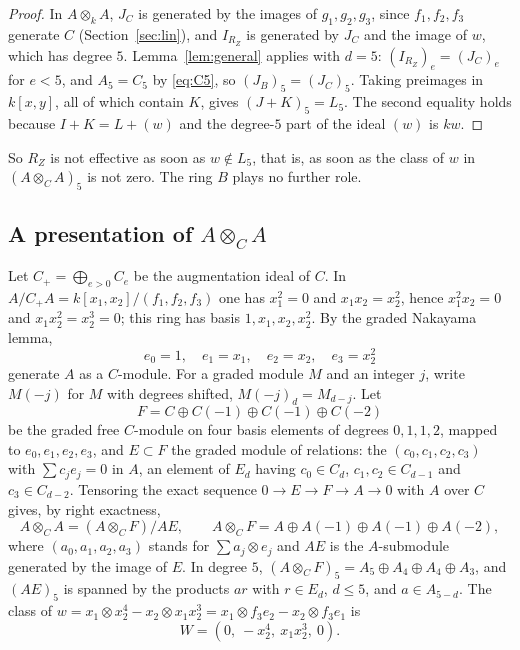\documentclass[11pt,a4paper]{amsart}
\theoremstyle{remark}
\begin{document}
\begin{proof}
In $A \otimes_k A$, $J_C$ is generated by the images of $g_1, g_2, g_3$, since $f_1, f_2, f_3$ generate $C$ (Section~\ref{sec:lin}), and $I_{R_Z}$ is generated by $J_C$ and the image of $w$, which has degree $5$. Lemma~\ref{lem:general} applies with $d = 5$: $(I_{R_Z})_e = (J_C)_e$ for $e < 5$, and $A_5 = C_5$ by \eqref{eq:C5}, so $(J_B)_5 = (J_C)_5$. Taking preimages in $k[x, y]$, all of which contain $K$, gives $(J + K)_5 = L_5$. The second equality holds because $I + K = L + (w)$ and the degree-$5$ part of the ideal $(w)$ is $kw$.
\end{proof}

So $R_Z$ is not effective as soon as $w \notin L_5$, that is, as soon as the class of $w$ in $(A \otimes_C A)_5$ is not zero. The ring $B$ plays no further role.

\subsection{A presentation of $A \otimes_C A$}
Let $C_+ = \bigoplus_{e > 0} C_e$ be the augmentation ideal of $C$. In $A/C_+A = k[x_1, x_2]/(f_1, f_2, f_3)$ one has $x_1^2 = 0$ and $x_1x_2 = x_2^2$, hence $x_1^2x_2 = 0$ and $x_1x_2^2 = x_2^3 = 0$; this ring has basis $1, x_1, x_2, x_2^2$. By the graded Nakayama lemma,
\[
e_0 = 1, \quad e_1 = x_1, \quad e_2 = x_2, \quad e_3 = x_2^2
\]
generate $A$ as a $C$-module. For a graded module $M$ and an integer $j$, write $M(-j)$ for $M$ with degrees shifted, $M(-j)_d = M_{d-j}$. Let
\[
F = C \oplus C(-1) \oplus C(-1) \oplus C(-2)
\]
be the graded free $C$-module on four basis elements of degrees $0, 1, 1, 2$, mapped to $e_0, e_1, e_2, e_3$, and $E \subset F$ the graded module of relations: the $(c_0, c_1, c_2, c_3)$ with $\sum c_j e_j = 0$ in $A$, an element of $E_d$ having $c_0 \in C_d$, $c_1, c_2 \in C_{d-1}$ and $c_3 \in C_{d-2}$. Tensoring the exact sequence $0 \to E \to F \to A \to 0$ with $A$ over $C$ gives, by right exactness,
\[
A \otimes_C A = (A \otimes_C F)/AE, \qquad A \otimes_C F = A \oplus A(-1) \oplus A(-1) \oplus A(-2),
\]
where $(a_0, a_1, a_2, a_3)$ stands for $\sum a_j \otimes e_j$ and $AE$ is the $A$-submodule generated by the image of $E$. In degree $5$, $(A \otimes_C F)_5 = A_5 \oplus A_4 \oplus A_4 \oplus A_3$, and $(AE)_5$ is spanned by the products $a r$ with $r \in E_d$, $d \le 5$, and $a \in A_{5-d}$. The class of $w = x_1 \otimes x_2^4 - x_2 \otimes x_1x_2^3 = x_1 \otimes f_3 e_2 - x_2 \otimes f_3 e_1$ is
\[
W = (0,\ -x_2^4,\ x_1x_2^3,\ 0).
\]
\end{document}
